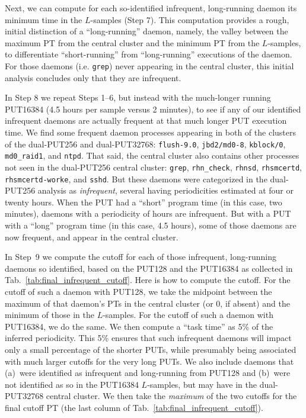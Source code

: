 \documentclass[letter]{ieice}
\begin{document}
Next, we can compute for each so-identified infrequent, long-running daemon its
minimum time in the \hbox{$L$-samples} (Step 7). 
This computation provides a rough, initial distinction of a ``long-running''
daemon, namely, the valley between the maximum PT from the central cluster 
and the minimum PT from the $L$-samples, to differentiate ``short-running'' 
from ``\hbox{long-running}'' executions of the daemon. 
For those daemons (i.e. {\tt grep}) never appearing in the central cluster,
this initial analysis concludes only that they are infrequent.

In Step 8 we repeat Steps 1--6, but instead with the much-longer running
PUT16384 (4.5 hours per sample versus 2 minutes), to see 
if any of our identified infrequent daemons are actually frequent 
at that much longer PUT execution time. 
We find some frequent daemon processes appearing in both of the 
clusters of the dual-PUT256 and dual-PUT32768: 
{\tt flush-9.0}, {\tt jbd2/md0-8}, {\tt kblock/0}, {\tt md0\_raid1}, 
and {\tt ntpd}. That said, the central cluster also contains other
  processes not seen in the dual-PUT256 central cluster: 
  {\tt grep}, {\tt rhn\_check}, {\tt rhnsd}, {\tt rhsmcertd}, 
  {\tt rhsmcertd-worke}, and {\tt sshd}. 
  But these daemons were categorized in the \hbox{dual-PUT256} analysis as {\em
  infrequent}, several having periodicities estimated at four or twenty hours.
When the PUT had a ``short'' 
program time (in this case, two minutes), daemons with a periodicity of
hours are infrequent. But with a PUT with a ``long'' program time (in this
case, 4.5 hours), some of those daemons are now frequent, and appear in the 
central cluster.

In Step~9 we compute 
the cutoff for each of those infrequent, long-running daemons so
identified, based on the PUT128 and the 
PUT16384 as collected in Tab.~\ref{tab:final_infrequent_cutoff}. 
Here is how to compute the cutoff. For the cutoff of such a daemon with PUT128, 
we take the midpoint between the maximum of that daemon's PTs in the 
central cluster (or 0, if absent) and the minimum of those in the $L$-samples. 
For the cutoff of such a daemon with PUT16384, we do the same. 
We then compute a ``task time'' as 5\% of the inferred periodicity. 
This 5\% ensures that such infrequent daemons will impact 
only a small percentage of the shorter PUTs, while presumably being 
associated with much larger cutoffs for the very long PUTs. 
We also include daemons that (a)~were identified as infrequent and 
\hbox{long-running} from PUT128 and (b)~were not identified as so in the PUT16384 
\hbox{$L$-samples}, but may have in the \hbox{dual-PUT32768} central cluster. 
We then take the {\em maximum} of the two cutoffs for the final cutoff PT 
(the last column of Tab.~\ref{tab:final_infrequent_cutoff}). 
\end{document}
